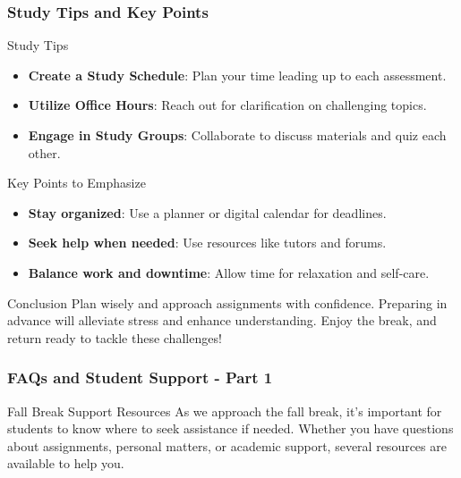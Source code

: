 \documentclass[aspectratio=169]{beamer}
\begin{document}
\begin{frame}[fragile]
    \frametitle{Study Tips and Key Points}
    \begin{block}{Study Tips}
        \begin{itemize}
            \item \textbf{Create a Study Schedule}: Plan your time leading up to each assessment.
            \item \textbf{Utilize Office Hours}: Reach out for clarification on challenging topics.
            \item \textbf{Engage in Study Groups}: Collaborate to discuss materials and quiz each other.
        \end{itemize}
    \end{block}
    
    \begin{block}{Key Points to Emphasize}
        \begin{itemize}
            \item \textbf{Stay organized}: Use a planner or digital calendar for deadlines.
            \item \textbf{Seek help when needed}: Use resources like tutors and forums.
            \item \textbf{Balance work and downtime}: Allow time for relaxation and self-care.
        \end{itemize}
    \end{block}
    
    \begin{block}{Conclusion}
        Plan wisely and approach assignments with confidence. Preparing in advance will alleviate stress and enhance understanding. Enjoy the break, and return ready to tackle these challenges!
    \end{block}
\end{frame}

\begin{frame}[fragile]
    \frametitle{FAQs and Student Support - Part 1}
    \begin{block}{Fall Break Support Resources}
        As we approach the fall break, it’s important for students to know where to seek assistance if needed. Whether you have questions about assignments, personal matters, or academic support, several resources are available to help you. 
    \end{block}
\end{frame}
\end{document}
